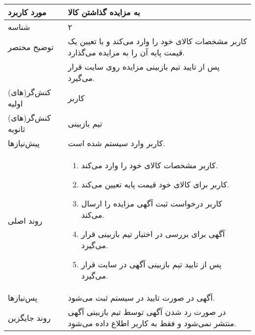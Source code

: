 \documentclass{article}
\begin{document}
\newpage

\begin{center}
\begin{tabular} {|p{}|p{}|}
\hline
 مورد کاربرد & 
 به مزایده گذاشتن کالا
\\ \hline
 شناسه &
۲
\\ \hline
توضیح مختصر &
کاربر مشخصات کالای خود را وارد می‌کند و با تعیین یک قیمت پایه آن را به مزایده می‌گذارد.
\\
&
پس از تایید تیم بازبینی مزایده روی سایت قرار می‌گیرد.
\\ \hline
کنش‌گر(های) اولیه &
کاربر
\\ \hline
کنش‌گر(های) ثانویه &
تیم بازبینی
\\ \hline
پیش‌نیازها &
کاربر وارد سیستم شده است.
\\ \hline
روند اصلی &
\begin{enumerate}
\item
کاربر مشخصات کالای خود را وارد می‌کند.
\item
کاربر برای کالای خود قیمت پایه تعیین می‌کند.
\item
کاربر درخواست ثبت آگهی مزایده را ارسال می‌کند.
\item
آگهی برای بررسی در اختیار تیم بازبینی قرار می‌گیرد.
\item
پس از تایید تیم بازبینی آگهی در سایت قرار می‌گیرد.
\end{enumerate}
\\ \hline
پس‌نیازها &
آگهی در صورت تایید در سیستم ثبت می‌شود.
\\ \hline
روند جایگزین &
در صورت رد شدن آگهی توسط تیم بازبینی آگهی منتشر نمی‌شود و فقط به کاربر اطلاع داده می‌شود. 
\\ \hline
\end{tabular}
\end{center}

\newpage
\end{document}
